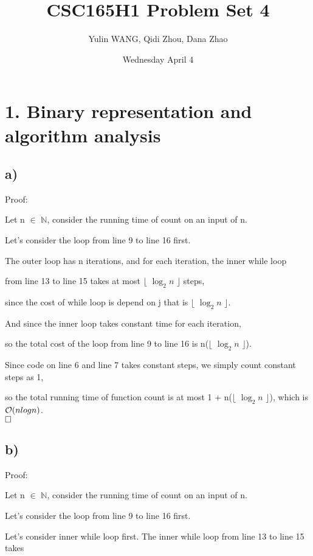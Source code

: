 \documentclass[12pt]{article}
\title{CSC165H1 Problem Set 4}
\author{Yulin WANG, Qidi Zhou, Dana Zhao}
\date{Wednesday April 4}
\begin{document}
\maketitle

\newpage
\section*{1. Binary representation and algorithm analysis} 
\vspace{40pt}
\subsection*{a)}
\vspace{20pt}
Proof:

Let n $\in$ $\mathbb{N}$, consider the running time of count on an input of n. 

Let's consider the loop from line 9 to line 16 first. 

The outer loop has n iterations, and for each iteration, the inner while loop 

from line 13 to line 15 takes at most $\lfloor$ $\log_2 n$ $\rfloor$ steps, 

since the cost of while loop is depend on j that is $\lfloor$ $\log_2 n$ $\rfloor$. 

And since the inner loop takes constant time for each iteration,

so the total cost of the loop from line 9 to line 16 is n($\lfloor$ $\log_2 n$ $\rfloor$). 

Since code on line 6 and line 7 takes constant steps, we simply count constant steps as 1, 

so the total running time of function count  is at most 1 + n($\lfloor$ $\log_2 n$ $\rfloor$), which is $\mathcal O (nlog n)$. \\

$\hfill\square$ 
\vspace{20pt}
\subsection*{b)}
\vspace{20pt}
Proof:

Let n $\in$ $\mathbb{N}$, consider the running time of count on an input of n. 

Let's consider the loop from line 9 to line 16 first.

Let's consider inner while loop first. The inner while loop from line 13 to line 15 takes 
\end{document}
